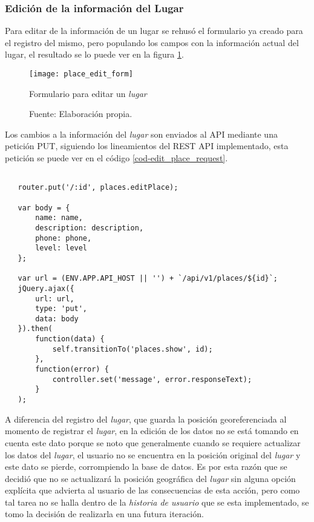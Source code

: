 \subsubsection{Edición de la información del Lugar}

Para editar de la información de un lugar se rehusó el formulario ya creado para el registro del mismo, pero populando los campos con la información actual del lugar, el resultado se lo puede ver en la figura \ref{fig:place_edit_form}. \\

\begin{figure}[H]
     \begin{center}
       \texttt{[image: place\_edit\_form]}

       \caption{Formulario para editar un \emph{lugar}}
       \label{fig:place_edit_form}
       \caption*{Fuente: Elaboración propia.}
     \end{center}
\end{figure}


Los cambios a la información del \emph{lugar} son enviados al API mediante una petición PUT, siguiendo los lineamientos del REST API implementado, esta petición se puede ver en el código \ref{cod-edit_place_request}.

\begin{center}
 \begin{lstlisting}[label=cod-edit_place_request,caption=Petición HTTP para editar un lugar.]

   router.put('/:id', places.editPlace);

   var body = {
       name: name,
       description: description,
       phone: phone,
       level: level
   };

   var url = (ENV.APP.API_HOST || '') + `/api/v1/places/${id}`;
   jQuery.ajax({
       url: url,
       type: 'put',
       data: body
   }).then(
       function(data) {
           self.transitionTo('places.show', id);
       },
       function(error) {
           controller.set('message', error.responseText);
       }
   );

 \end{lstlisting}
\end{center}

A diferencia del registro del \emph{lugar}, que guarda la posición georeferenciada al momento de registrar el \emph{lugar}, en la edición de los datos no se está tomando en cuenta este dato porque se noto que generalmente cuando se requiere actualizar los datos del \emph{lugar}, el usuario no se encuentra en la posición original del \emph{lugar} y este dato se pierde, corrompiendo la base de datos. Es por esta razón que se decidió que no se actualizará la posición geográfica del \emph{lugar} sin alguna opción explícita que advierta al usuario de las consecuencias de esta acción, pero como tal tarea no se halla dentro de la \emph{historia de usuario} que se esta implementado, se tomo la decisión de realizarla en una futura iteración.








